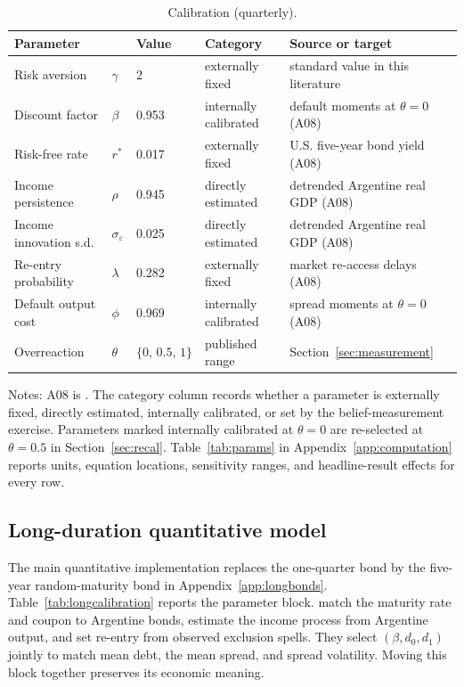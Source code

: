 \documentclass[11pt]{article}
\theoremstyle{definition}
\begin{document}
\begin{table}[t]
\centering
\caption{Calibration (quarterly).}
\label{tab:calibration}
\footnotesize
\begin{tabular}{lllll}
\toprule
Parameter & & Value & Category & Source or target \\
\midrule
Risk aversion & $\gamma$ & 2 & externally fixed & standard value in this literature \\
Discount factor & $\beta$ & 0.953 & internally calibrated & default moments at $\theta=0$ (A08) \\
Risk-free rate & $r^*$ & 0.017 & externally fixed & U.S. five-year bond yield (A08) \\
Income persistence & $\rho$ & 0.945 & directly estimated & detrended Argentine real GDP (A08) \\
Income innovation s.d. & $\sigma_\varepsilon$ & 0.025 & directly estimated & detrended Argentine real GDP (A08) \\
Re-entry probability & $\lambda$ & 0.282 & externally fixed & market re-access delays (A08) \\
Default output cost & $\phi$ & 0.969 & internally calibrated & spread moments at $\theta=0$ (A08) \\
Overreaction & $\theta$ & $\{0,\, 0.5,\, 1\}$ & published range & Section~\ref{sec:measurement} \\
\bottomrule
\end{tabular}
\par\smallskip
\begin{minipage}{0.95\textwidth}
\footnotesize Notes: A08 is \citet{Arellano2008}. The category column records whether a parameter is externally fixed, directly estimated, internally calibrated, or set by the belief-measurement exercise. Parameters marked internally calibrated at $\theta = 0$ are re-selected at $\theta = 0.5$ in Section~\ref{sec:recal}. Table~\ref{tab:params} in Appendix~\ref{app:computation} reports units, equation locations, sensitivity ranges, and headline-result effects for every row.
\end{minipage}
\end{table}

\subsection{Long-duration quantitative model}\label{sec:longquant}

The main quantitative implementation replaces the one-quarter bond by the five-year random-maturity bond in Appendix~\ref{app:longbonds}. Table~\ref{tab:longcalibration} reports the parameter block. \citet{ChatterjeeEyigungor2012} match the maturity rate and coupon to Argentine bonds, estimate the income process from Argentine output, and set re-entry from observed exclusion spells. They select $(\beta,d_0,d_1)$ jointly to match mean debt, the mean spread, and spread volatility. Moving this block together preserves its economic meaning.
\end{document}
